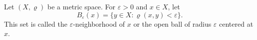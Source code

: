 Let $(X, \varrho)$ be a metric space. For $\varepsilon > 0$ and $x \in X$, let
$$B_{\varepsilon}(x) = \{y \in X : \varrho(x, y) < \varepsilon\}.$$
This set is called the $\varepsilon$-neighborhood of $x$ or the open ball of radius $\varepsilon$ centered at $x$.